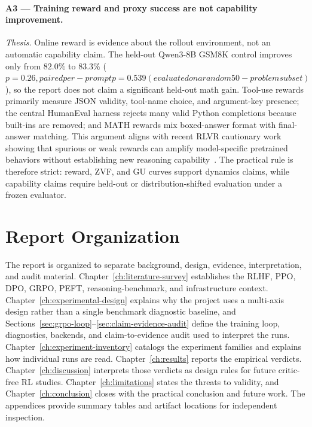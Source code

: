 \documentclass[12pt,a4paper]{report}
\begin{document}
\paragraph{A3 --- Training reward and proxy success are not capability improvement.}
\emph{Thesis.} Online reward is evidence about the rollout environment, not an automatic capability claim. The held-out Qwen3-8B GSM8K control improves only from $82.0\%$ to $83.3\%$ ($p=0.26, paired per-prompt p=0.539 (evaluated on a random 50-problem subset)$), so the report does not claim a significant held-out math gain. Tool-use rewards primarily measure JSON validity, tool-name choice, and argument-key presence; the central HumanEval harness rejects many valid Python completions because built-ins are removed; and MATH rewards mix boxed-answer format with final-answer matching. This argument aligns with recent RLVR cautionary work showing that spurious or weak rewards can amplify model-specific pretrained behaviors without establishing new reasoning capability~\citep{shao2025spurious,liu2025r1zerocritical}. The practical rule is therefore strict: reward, ZVF, and GU curves support dynamics claims, while capability claims require held-out or distribution-shifted evaluation under a frozen evaluator.



\section{Report Organization}
\label{sec:report-organization}

The report is organized to separate background, design, evidence, interpretation, and audit material. Chapter~\ref{ch:literature-survey} establishes the RLHF, PPO, DPO, GRPO, PEFT, reasoning-benchmark, and infrastructure context. Chapter~\ref{ch:experimental-design} explains why the project uses a multi-axis design rather than a single benchmark diagnostic baseline, and Sections~\ref{sec:grpo-loop}--\ref{sec:claim-evidence-audit} define the training loop, diagnostics, backends, and claim-to-evidence audit used to interpret the runs. Chapter~\ref{ch:experiment-inventory} catalogs the experiment families and explains how individual runs are read. Chapter~\ref{ch:results} reports the empirical verdicts. Chapter~\ref{ch:discussion} interprets those verdicts as design rules for future critic-free RL studies. Chapter~\ref{ch:limitations} states the threats to validity, and Chapter~\ref{ch:conclusion} closes with the practical conclusion and future work. The appendices provide summary tables and artifact locations for independent inspection.
\end{document}
